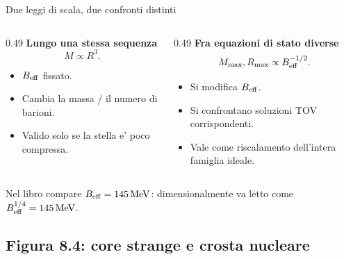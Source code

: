 \begin{frame}{Due leggi di scala, due confronti distinti}
\small
\begin{columns}[T,onlytextwidth]
\begin{column}{0.49\textwidth}
\textbf{Lungo una stessa sequenza}
\[
M\propto R^3.
\]
\begin{itemize}
\item $B_{\rm eff}$ fissato.
\item Cambia la massa / il numero di barioni.
\item Valido solo se la stella e' poco compressa.
\end{itemize}
\end{column}
\begin{column}{0.49\textwidth}
\textbf{Fra equazioni di stato diverse}
\[
M_{\max},R_{\max}\propto B_{\rm eff}^{-1/2}.
\]
\begin{itemize}
\item Si modifica $B_{\rm eff}$.
\item Si confrontano soluzioni TOV corrispondenti.
\item Vale come riscalamento dell'intera famiglia ideale.
\end{itemize}
\end{column}
\end{columns}
\medskip
Nel libro compare $B_{\rm eff}=145\,\mathrm{MeV}$: dimensionalmente va letto come $B_{\rm eff}^{1/4}=145\,\mathrm{MeV}$.
\end{frame}

\subsection{Figura 8.4: core strange e crosta nucleare}

